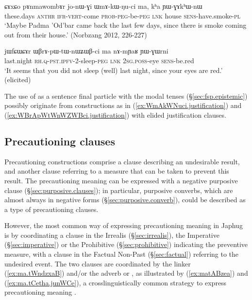 \begin{exe}
\ex \label{ex:WmAkWNuci.justification}
 \gll ɕɤxɕo pɤnmawombɤr jo-nɯ-ɣi ɯmɤ-kɯ-ŋu-ci ma, kʰa ɲɯ-ɣɤkʰɯ-nɯ \\
these.days  \textsc{anthr} \textsc{ifr}-\textsc{vert}-come \textsc{prob}-\textsc{peg}-be-\textsc{peg} \textsc{lnk} house \textsc{sens}-have.smoke-\textsc{pl} \\
\glt `Maybe Padma 'Od'bar came back the last few days, since there is smoke coming out from their house.' (Norbzang 2012, 226-227)
\end{exe} 

 \begin{exe}
\ex \label{ex:WBrApWtWnWZWBci.justification}
 \gll  jɯfɕɯɕɤr ɯβrɤ-pɯ-tɯ-nɯʑɯβ-ci ma nɤ-mɲaʁ ɲɯ-ɣɯrni \\
 last.night \textsc{rh}.\textsc{q}-\textsc{pst}.\textsc{ipfv}-2-sleep-\textsc{peg} \textsc{lnk} \textsc{2sg}.\textsc{poss}-eye \textsc{sens}-be.red \\
 \glt `It seems that you did not sleep (well) last night, since your eyes are red.' (elicited)
\end{exe} 

 The use of  as a sentence final particle with the modal tenses (§\ref{sec:fsp.epistemic}) possibly originate from constructions as in (\ref{ex:WmAkWNuci.justification}) and (\ref{ex:WBrApWtWnWZWBci.justification}) with elided justification clauses.
 
\subsection{Precautioning clauses} \label{sec:precautioning.clauses} 
Precautioning constructions comprise a clause describing an undesirable result, and another clause referring to a measure that can be taken to prevent this result. The precautioning meaning can be expressed with a negative purposive clause (§\ref{sec:purposive.clauses}); in particular, purposive converbs, which are almost always in negative forms (§\ref{sec:purposive.converb}), could be described as a type of precautioning clauses.

However, the most common way of expressing precautioning meaning in Japhug is by coordinating a clause in the Irrealis (§\ref{sec:irrealis}), the Imperative (§\ref{sec:imperative}) or the Prohibitive (§\ref{sec:prohibitive}) indicating the preventive measure, with a clause in the Factual Non-Past (§\ref{sec:factual}) referring to the undesired event. The two clauses are coordinated by the linker  (\ref{ex:ma.tWndzxaB}) and/or the adverb  or , as illustrated by (\ref{ex:matABzea}) and (\ref{ex:ma.tCetha.junWCe}), a crosslinguistically common strategy to express precautioning meaning \citep{angelo16beware}.

